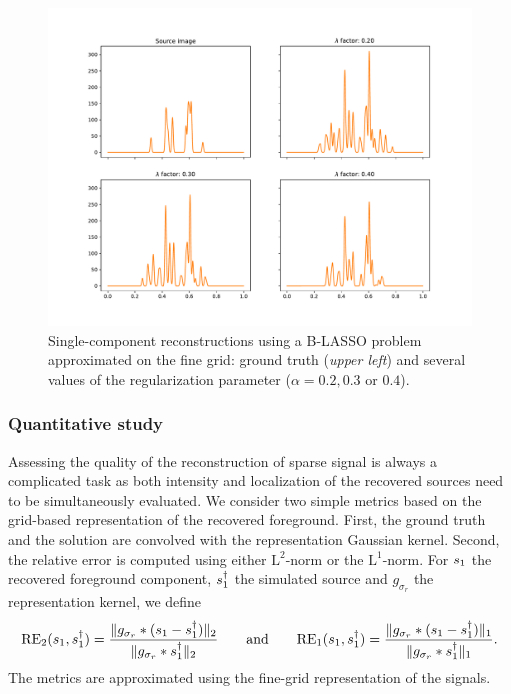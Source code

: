 \documentclass[12pt]{article}
\begin{document}
        \begin{figure}[t]
            \centering
            \includegraphics[width=\linewidth, trim=0 2cm 0 2.2cm, clip]{figures/simple_reco/blasso_merged.pdf}
            \caption{Single-component reconstructions using a B-LASSO problem approximated on the fine grid: ground truth (\textit{upper left}) and several values of the regularization parameter ($\alpha=0.2, 0.3$ or $0.4$). %
            }
            \label{fig:simple:blasso-conv}
        \end{figure}
        
        \subsubsection{Quantitative study}

        Assessing the quality of the reconstruction of sparse signal is always a complicated task as both intensity and localization of the recovered sources need to be simultaneously evaluated. We consider two simple metrics based on the grid-based representation of the recovered foreground. First, the ground truth and the solution are convolved with the representation Gaussian kernel. Second, the relative error is computed using either $\mathrm{L}^2$-norm or the $\mathrm{L}^1$-norm. For $s_1$ the recovered foreground component, $s_1^\dagger$ the simulated source and $g_{\sigma_r}$ the representation kernel, we define
        $$
        \mathrm{RE}_2(s_1, s_1^\dagger) = \frac{\lVert g_{\sigma_r} * (s_1 - s_1^\dagger) \rVert_2 }{ \lVert g_{\sigma_r} * s_1^\dagger \rVert_2} \qquad\text{and}\qquad
        \mathrm{RE}_1(s_1, s_1^\dagger) = \frac{\lVert g_{\sigma_r} * (s_1 - s_1^\dagger) \rVert_1}{\lVert g_{\sigma_r} *s_1^\dagger \rVert_1}.
        $$
        The metrics are approximated using the fine-grid representation of the signals.
\end{document}
